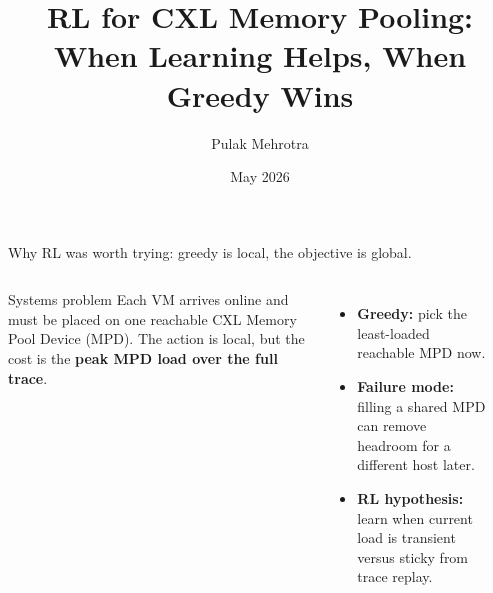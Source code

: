 \documentclass[11pt,aspectratio=43]{beamer}
\title{RL for CXL Memory Pooling:\\When Learning Helps, When Greedy Wins}
\author{Pulak Mehrotra}
\date{May 2026}
\begin{document}
\begin{frame}[plain]
  \titlepage
\end{frame}


\begin{frame}[shrink=7]{Why RL was worth trying: greedy is local, the objective is global.}

  \begin{columns}[T,onlytextwidth]

      \vspace{0.2em}
      \begin{block}{Systems problem}
        \small
        Each VM arrives online and must be placed on one reachable CXL Memory
        Pool Device (MPD).  The action is local, but the cost is the
        \textbf{peak MPD load over the full trace}.
      \end{block}

      \vspace{0.5em}
      \begin{itemize}
        \setlength{\itemsep}{0.40em}
        \item \textbf{Greedy:} pick the least-loaded reachable MPD now.
        \item \textbf{Failure mode:} filling a shared MPD can remove headroom
              for a different host later.
        \item \textbf{RL hypothesis:} learn when current load is transient
              versus sticky from trace replay.
      \end{itemize}

      \begin{center}
\end{center}
\end{columns}
\end{frame}
\end{document}
